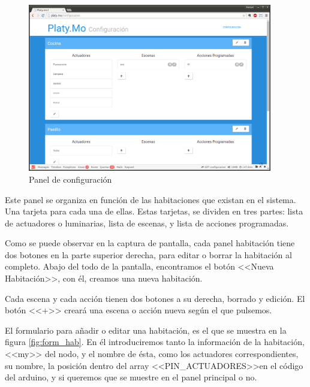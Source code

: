      \begin{figure}[htbp]
         \centering
         \includegraphics[width=0.95\textwidth]{imagenes/panel_config.png}
         \caption{Panel de configuración}
         \label{fig:panel_config}
        \end{figure}
        
    Este panel se organiza en función de las habitaciones que existan en el sistema. Una tarjeta para cada una de ellas. Estas tarjetas, se dividen en tres partes: lista de actuadores o luminarias, lista de escenas, y lista de acciones programadas.
    
    Como se puede observar en la captura de pantalla, cada panel habitación tiene dos botones en la parte superior derecha, para editar o borrar la habitación al completo. Abajo del todo de la pantalla, encontramos el botón <<Nueva Habitación>>, con él, creamos una nueva habitación. 
    
    Cada escena y cada acción tienen dos botones a su derecha, borrado y edición. El botón <<+>> creará una escena o acción nueva según el que pulsemos.
    
    El formulario para añadir o editar una habitación, es el que se muestra en la figura \ref{fig:form_hab}. En él introduciremos tanto la información de la habitación, <<my>> del nodo, y el nombre de ésta, como los actuadores correspondientes, su nombre, la posición dentro del array <<PIN\_ACTUADORES>>en el código del arduino, y si queremos que se muestre en el panel principal o no.
    
    
    
